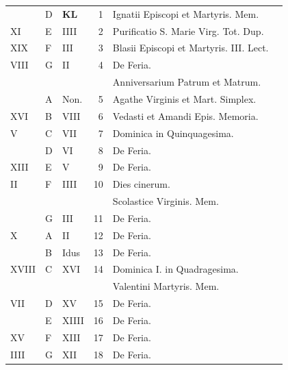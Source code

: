 \begin{center}
\begin{tabular}{l | l | l | r | l l}
 & D & \textbf{\color{Red} K\color{Blue}L} & 1 & \color{Red} Ignatii Episcopi et Martyris. Mem. \\

\color{Red} XI & E & \color{Red} IIII & 2 & \multicolumn{2}{l}{Purificatio S. Marie Virg. Tot. Dup.} \\
\color{Red} XIX & F & \color{Red} III & 3 & \color{Red} Blasii Episcopi et Martyris. III. Lect. \\
\color{Red} VIII & G & \color{Red} II & 4 & De Feria. \\
 &  & & & \quad Anniversarium Patrum et Matrum. \\
 & \color{Red} A & \color{Red} Non. & 5 & \color{Red} Agathe Virginis et Mart. Simplex. \\
\color{Red} XVI & B & \color{Red} VIII & 6 & Vedasti et Amandi Epis. Memoria. \\
\color{Red} V & C & \color{Red} VII & 7 & \color{Red} Dominica in Quinquagesima. \\
\color{Red}  & D & \color{Red} VI & 8 & De Feria. \\
\color{Red} XIII & E & \color{Red} V & 9 & De Feria. & \color{Red} \\
\color{Red} II & F & \color{Red} IIII & 10 & \color{Red} Dies cinerum. \\
 &  & & & \quad Scolastice Virginis. Mem. & \color{Red} \\
\color{Red}  & G & \color{Red} III & 11 & De Feria. & \color{Red} \\
\color{Red} X & \color{Red} A & \color{Red} II & 12 & De Feria. \\
\color{Red}  & B & \color{Red} Idus & 13 & De Feria. & \color{Red} \\
\color{Red} XVIII & C & \color{Red} XVI & 14 & \color{Red} Dominica I. in Quadragesima. \\
&  & & & \quad \color{Red} Valentini Martyris. Mem. \\
\color{Red} VII & D & \color{Red} XV & 15 & De Feria. \\
\color{Red}  & E & \color{Red} XIIII & 16 & De Feria. & \color{Red} \\
\color{Red} XV & F & \color{Red} XIII & 17 & De Feria. & \color{Red} \\
\color{Red} IIII & G & \color{Red} XII & 18 & De Feria. & \color{Red} \\

\end{tabular}
\end{center}
